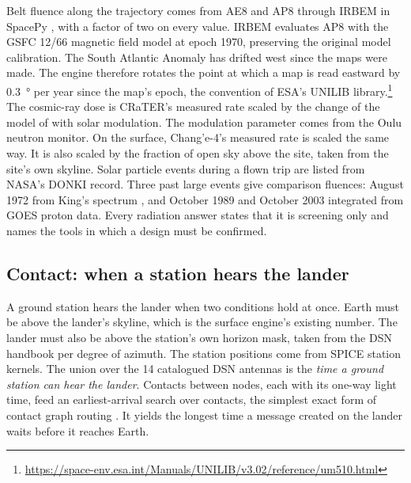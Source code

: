 \documentclass[11pt,a4paper]{article}
\begin{document}
Belt fluence along the trajectory comes from AE8 and AP8 \citep{vette1991,sawyer1976}
through IRBEM in SpacePy \citep{niehof2022}, with a factor of two on every value. IRBEM
evaluates AP8 with the GSFC 12/66 magnetic field model at epoch 1970, preserving the
original model calibration. The South Atlantic Anomaly has drifted west since the maps were
made. The engine therefore rotates the point at which a map is read eastward by
\qty{0.3}{\degree} per year since the map's epoch, the convention of ESA's UNILIB
library.\footnote{\url{https://space-env.esa.int/Manuals/UNILIB/v3.02/reference/um510.html}} The cosmic-ray dose is CRaTER's measured rate \citep{schwadron2012} scaled
by the change of the model of \citet{matthia2013} with solar modulation. The modulation
parameter comes from the Oulu neutron monitor. On the surface, Chang'e-4's measured
rate \citep{zhang2020} is scaled the same way. It is also scaled by the fraction of open
sky above the site, taken from the site's own skyline. Solar particle events during a flown trip are
listed from NASA's DONKI record. Three past large events give comparison fluences: August
1972 from King's spectrum \citep{king1974}, and October 1989 and October 2003 integrated
from GOES proton data. Every radiation answer states that it is screening only and names
the tools in which a design must be confirmed.

\subsection{Contact: when a station hears the lander}

A ground station hears the lander when two conditions hold at once. Earth must be above
the lander's skyline, which is the surface engine's existing number. The lander must
also be above the station's own horizon mask, taken from the DSN handbook
\citep{jpl810005} per degree of azimuth. The station positions come from SPICE station
kernels. The union over the 14 catalogued DSN antennas is the \emph{time a ground station
can hear the lander}. Contacts between nodes, each with its one-way light time, feed an
earliest-arrival search over contacts, the simplest exact form of contact graph routing
\citep{araniti2015}. It yields the longest time a message created on the lander waits
before it reaches Earth.
\end{document}
